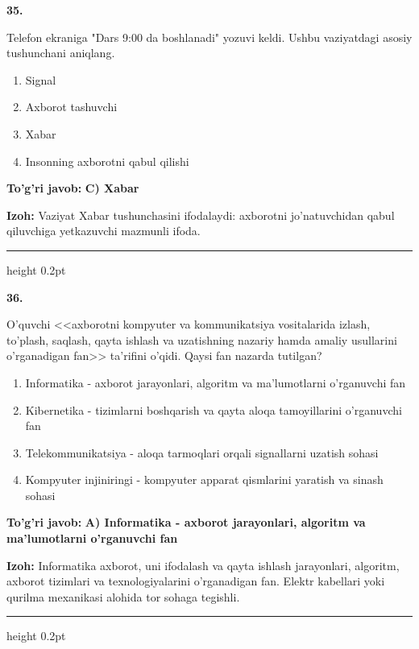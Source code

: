 \documentclass[10pt,a4paper,oneside]{article}
\begin{document}
\noindent\textbf{\color{ink}35.}
\par
Telefon ekraniga "Dars 9:00 da boshlanadi" yozuvi keldi. Ushbu vaziyatdagi asosiy tushunchani aniqlang.
\begin{enumerate}[label=\Alph*),leftmargin=9mm]
\item Signal
\item Axborot tashuvchi
\item Xabar
\item Insonning axborotni qabul qilishi
\end{enumerate}
\begin{tcolorbox}[enhanced,breakable,colback=teal!4,colframe=teal!50!black,boxrule=0.5pt,arc=1.1mm,left=3mm,right=3mm,top=1.7mm,bottom=1.7mm,before skip=2mm,after skip=2mm]
\textbf{\color{teal}To'g'ri javob:} \textbf{C) Xabar}
\par\smallskip
\textbf{Izoh:} Vaziyat Xabar tushunchasini ifodalaydi: axborotni jo'natuvchidan qabul qiluvchiga yetkazuvchi mazmunli ifoda.
\end{tcolorbox}
\vspace{2mm}\hrule height 0.2pt \vspace{3mm}

\noindent\textbf{\color{ink}36.}
\par
O'quvchi <<axborotni kompyuter va kommunikatsiya vositalarida izlash, to'plash, saqlash, qayta ishlash va uzatishning nazariy hamda amaliy usullarini o'rganadigan fan>> ta'rifini o'qidi. Qaysi fan nazarda tutilgan?
\begin{enumerate}[label=\Alph*),leftmargin=9mm]
\item Informatika - axborot jarayonlari, algoritm va ma'lumotlarni o'rganuvchi fan
\item Kibernetika - tizimlarni boshqarish va qayta aloqa tamoyillarini o'rganuvchi fan
\item Telekommunikatsiya - aloqa tarmoqlari orqali signallarni uzatish sohasi
\item Kompyuter injiniringi - kompyuter apparat qismlarini yaratish va sinash sohasi
\end{enumerate}
\begin{tcolorbox}[enhanced,breakable,colback=teal!4,colframe=teal!50!black,boxrule=0.5pt,arc=1.1mm,left=3mm,right=3mm,top=1.7mm,bottom=1.7mm,before skip=2mm,after skip=2mm]
\textbf{\color{teal}To'g'ri javob:} \textbf{A) Informatika - axborot jarayonlari, algoritm va ma'lumotlarni o'rganuvchi fan}
\par\smallskip
\textbf{Izoh:} Informatika axborot, uni ifodalash va qayta ishlash jarayonlari, algoritm, axborot tizimlari va texnologiyalarini o'rganadigan fan. Elektr kabellari yoki qurilma mexanikasi alohida tor sohaga tegishli.
\end{tcolorbox}
\vspace{2mm}\hrule height 0.2pt \vspace{3mm}
\end{document}
